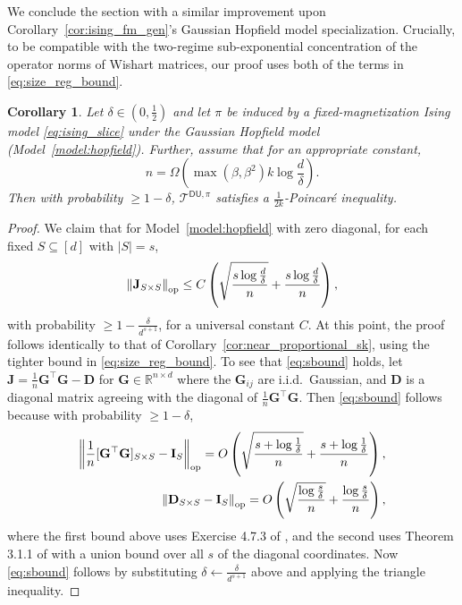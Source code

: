\documentclass[11pt]{article}
\newtheorem{corollary}{Corollary}
\newcommand{\normop}[1]{\left\lVert#1\right\rVert_{\textup{op}}}
\newcommand{\R}{\mathbb{R}}
\newcommand{\half}{\frac{1}{2}}
\newcommand{\1}{\mathbf{1}}
\newcommand{\0}{\mathbf{0}}
\newcommand{\id}{\mathbf{I}}
\newcommand{\Par}[1]{\left(#1\right)}
\newcommand{\md}{{\mathbf{D}}}
\newcommand{\mg}{{\mathbf{G}}}
\newcommand{\mj}{{\mathbf{J}}}
\newcommand{\calT}{{\mathcal{T}}}
\newcommand{\TDU}[1]{\calT^{\mathsf{DU}, #1}}
\begin{document}
We conclude the section with a similar improvement upon Corollary~\ref{cor:ising_fm_gen}'s Gaussian Hopfield model specialization. Crucially, to be compatible with the two-regime sub-exponential concentration of the operator norms of Wishart matrices, our proof uses both of the terms in \eqref{eq:size_reg_bound}.

\begin{corollary}\label{cor:trickle_ghop}
Let $\delta \in (0, \half)$ and let $\pi$ be induced by a fixed-magnetization Ising model \eqref{eq:ising_slice} under the Gaussian Hopfield model (Model~\ref{model:hopfield}). Further, assume that for an appropriate constant,
\[n = \Omega\Par{\max(\beta, \beta^2)k\log \frac d \delta}.\]
Then with probability $\ge 1 - \delta$, $\TDU{\pi}$ satisfies a $\frac 1 {2k}$-Poincar\'e inequality.
\end{corollary}
\begin{proof}
We claim that for Model~\ref{model:hopfield} with zero diagonal, for each fixed $S \subseteq [d]$ with $|S| = s$,
\begin{equation}\label{eq:sbound} \normop{\mj_{S \times S}} \le C\Par{\sqrt{\frac{s \log \frac d \delta}{n}} + \frac{s \log \frac d \delta}{n}},\end{equation}
with probability $\ge 1 - \frac \delta {d^{s + 1}}$, for a universal constant $C$. At this point, the proof follows identically to that of Corollary~\ref{cor:near_proportional_sk}, using the tighter bound in \eqref{eq:size_reg_bound}.
To see that \eqref{eq:sbound} holds, let $\mj = \frac 1 n \mg^\top \mg - \md$ for $\mg \in \R^{n \times d}$ where the $\mg_{ij}$ are i.i.d.\ Gaussian, and $\md$ is a diagonal matrix agreeing with the diagonal of $\frac 1 n \mg^\top \mg$. Then \eqref{eq:sbound} follows because with probability $\ge 1 - \delta$,
\begin{equation}\label{eq:two_term_conc}
\begin{aligned}\normop{\frac 1 n [\mg^\top \mg]_{S \times S} - \id_{S}} = O\Par{\sqrt{\frac{s + \log \frac 1 \delta}{n}} + \frac{s + \log \frac 1 \delta}{n}},\\
\normop{\md_{S \times S} - \id_{S}} = O\Par{\sqrt{\frac{\log \frac s \delta}{n}} + \frac{\log \frac s \delta}{n}},\end{aligned}
\end{equation}
where the first bound above uses Exercise 4.7.3 of \cite{Vershynin18}, and the second uses Theorem 3.1.1 of \cite{Vershynin18} with a union bound over all $s$ of the diagonal coordinates. Now \eqref{eq:sbound} follows by substituting $\delta \gets \frac \delta {d^{s + 1}}$ above and applying the triangle inequality.
\end{proof}
\end{document}
